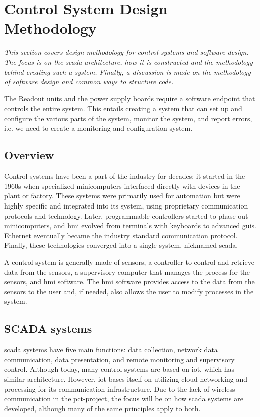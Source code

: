 \documentclass[main.tex]{subfiles}
\begin{document}
\section{Control System Design Methodology}
\textit{This section covers design methodology for control systems and software design. The focus is on the \gls{scada} architecture, how it is constructed and the methodology behind creating such a system. Finally, a discussion is made on the methodology of software design and common ways to structure code.}

The Readout units and the power supply boards require a software endpoint that controls the entire system. This entails creating a system that can set up and configure the various parts of the system, monitor the system, and report errors, i.e. we need to create a monitoring and configuration system.

\subsection{Overview}
Control systems have been a part of the industry for decades; it started in the 1960s when specialized minicomputers interfaced directly with devices in the plant or factory\cite{scada_history}. These systems were primarily used for automation but were highly specific and integrated into its system, using proprietary communication protocols and technology. Later, programmable controllers started to phase out minicomputers, and \gls{hmi} evolved from terminals with keyboards to advanced \gls{gui}s. Ethernet eventually became the industry standard communication protocol. Finally, these technologies converged into a single system, nicknamed \gls{scada}.

A control system is generally made of sensors, a controller to control and retrieve data from the sensors, a supervisory computer that manages the process for the sensors, and \gls{hmi} software. The \gls{hmi} software provides access to the data from the sensors to the user and, if needed, also allows the user to modify processes in the system.


\subsection{SCADA systems}
 \gls{scada} systems have five main functions: data collection, network data communication, data presentation, and remote monitoring and supervisory control\cite{scada_intro}. Although today, many control systems are based on \gls{iot}, which has similar architecture. However, \gls{iot} bases itself on utilizing cloud networking and processing for its communication infrastructure. Due to the lack of wireless communication in the \gls{pct}-project, the focus will be on how \gls{scada} systems are developed, although many of the same principles apply to both.
\end{document}
